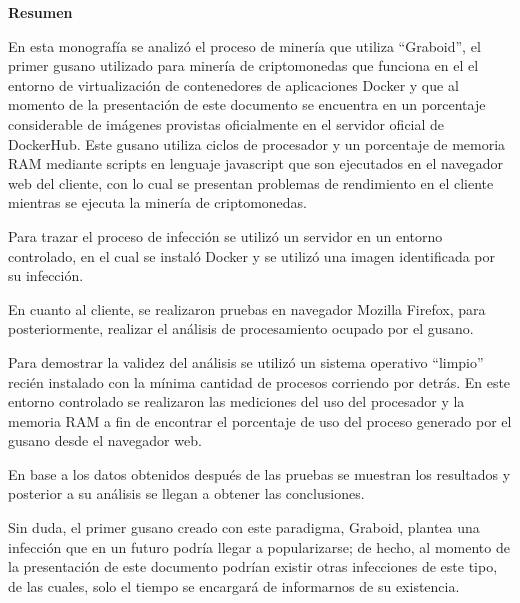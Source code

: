 \documentclass[../main/main.tex]{subfiles}
\begin{document}
  \begin{center}
    \textbf{\large Resumen}
  \end{center}

  En esta monografía se analizó el proceso de minería que utiliza ``Graboid'', el primer gusano utilizado para minería de criptomonedas que funciona en el el entorno de virtualización de contenedores de aplicaciones Docker y que al momento de la presentación de este documento se encuentra en un porcentaje considerable de imágenes provistas oficialmente en el servidor oficial de DockerHub. Este gusano utiliza ciclos de procesador y un porcentaje de memoria RAM mediante scripts en lenguaje javascript que son ejecutados en el navegador web del cliente, con lo cual se presentan problemas de rendimiento en el cliente mientras se ejecuta la minería de criptomonedas.

  Para trazar el proceso de infección se utilizó un servidor en un entorno controlado, en el cual se instaló Docker y se utilizó una imagen identificada por su infección.

  En cuanto al cliente, se realizaron pruebas en navegador Mozilla Firefox, para posteriormente, realizar el análisis de procesamiento ocupado por el gusano.

  Para demostrar la validez del análisis se utilizó un sistema operativo ``limpio'' recién instalado con la mínima cantidad de procesos corriendo por detrás. En este entorno controlado se realizaron las mediciones del uso del procesador y la memoria RAM a fin de encontrar el porcentaje de uso del proceso generado por el gusano desde el navegador web.

  En base a los datos obtenidos después de las pruebas se muestran los resultados y posterior a su análisis se llegan a obtener las conclusiones.

  Sin duda, el primer gusano creado con este paradigma, Graboid, plantea una infección que en un futuro podría llegar a popularizarse; de hecho, al momento de la presentación de este documento podrían existir otras infecciones de este tipo, de las cuales, solo el tiempo se encargará de informarnos de su existencia.
\end{document}
